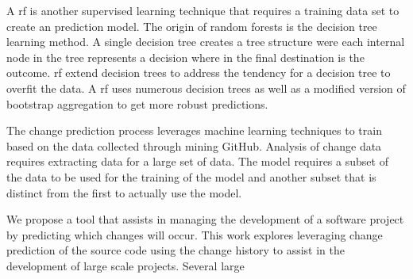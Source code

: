 A \gls{rf} is another supervised learning technique that requires a training data set to create an prediction model. The origin of random forests is the decision tree learning method. A single decision tree creates a tree structure were each internal node in the tree represents a decision where in the final destination is the outcome. \gls{rf} extend decision trees to address the tendency for a decision tree to overfit the data. A \gls{rf} uses numerous decision trees as well as a modified version of bootstrap aggregation to get more robust predictions.



The change prediction process leverages machine learning techniques to train based on the data collected through mining GitHub. Analysis of change data requires extracting data for a large set of data. The model requires a subset of the data to be used for the training of the model and another subset that is distinct from the first to actually use the model.



We propose a tool that assists in managing the development of a software project by predicting which changes will occur. This work explores leveraging change prediction of the source code using the change history to assist in the development of large scale projects. Several large \

